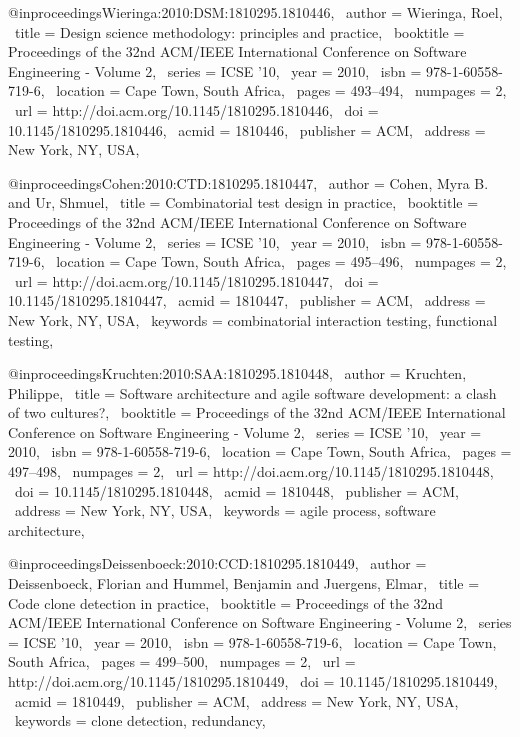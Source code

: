 @inproceedings{Wieringa:2010:DSM:1810295.1810446,
 author = {Wieringa, Roel},
 title = {Design science methodology: principles and practice},
 booktitle = {Proceedings of the 32nd ACM/IEEE International Conference on Software Engineering - Volume 2},
 series = {ICSE '10},
 year = {2010},
 isbn = {978-1-60558-719-6},
 location = {Cape Town, South Africa},
 pages = {493--494},
 numpages = {2},
 url = {http://doi.acm.org/10.1145/1810295.1810446},
 doi = {10.1145/1810295.1810446},
 acmid = {1810446},
 publisher = {ACM},
 address = {New York, NY, USA},
} 

@inproceedings{Cohen:2010:CTD:1810295.1810447,
 author = {Cohen, Myra B. and Ur, Shmuel},
 title = {Combinatorial test design in practice},
 booktitle = {Proceedings of the 32nd ACM/IEEE International Conference on Software Engineering - Volume 2},
 series = {ICSE '10},
 year = {2010},
 isbn = {978-1-60558-719-6},
 location = {Cape Town, South Africa},
 pages = {495--496},
 numpages = {2},
 url = {http://doi.acm.org/10.1145/1810295.1810447},
 doi = {10.1145/1810295.1810447},
 acmid = {1810447},
 publisher = {ACM},
 address = {New York, NY, USA},
 keywords = {combinatorial interaction testing, functional testing},
} 

@inproceedings{Kruchten:2010:SAA:1810295.1810448,
 author = {Kruchten, Philippe},
 title = {Software architecture and agile software development: a clash of two cultures?},
 booktitle = {Proceedings of the 32nd ACM/IEEE International Conference on Software Engineering - Volume 2},
 series = {ICSE '10},
 year = {2010},
 isbn = {978-1-60558-719-6},
 location = {Cape Town, South Africa},
 pages = {497--498},
 numpages = {2},
 url = {http://doi.acm.org/10.1145/1810295.1810448},
 doi = {10.1145/1810295.1810448},
 acmid = {1810448},
 publisher = {ACM},
 address = {New York, NY, USA},
 keywords = {agile process, software architecture},
} 

@inproceedings{Deissenboeck:2010:CCD:1810295.1810449,
 author = {Deissenboeck, Florian and Hummel, Benjamin and Juergens, Elmar},
 title = {Code clone detection in practice},
 booktitle = {Proceedings of the 32nd ACM/IEEE International Conference on Software Engineering - Volume 2},
 series = {ICSE '10},
 year = {2010},
 isbn = {978-1-60558-719-6},
 location = {Cape Town, South Africa},
 pages = {499--500},
 numpages = {2},
 url = {http://doi.acm.org/10.1145/1810295.1810449},
 doi = {10.1145/1810295.1810449},
 acmid = {1810449},
 publisher = {ACM},
 address = {New York, NY, USA},
 keywords = {clone detection, redundancy},
} 

